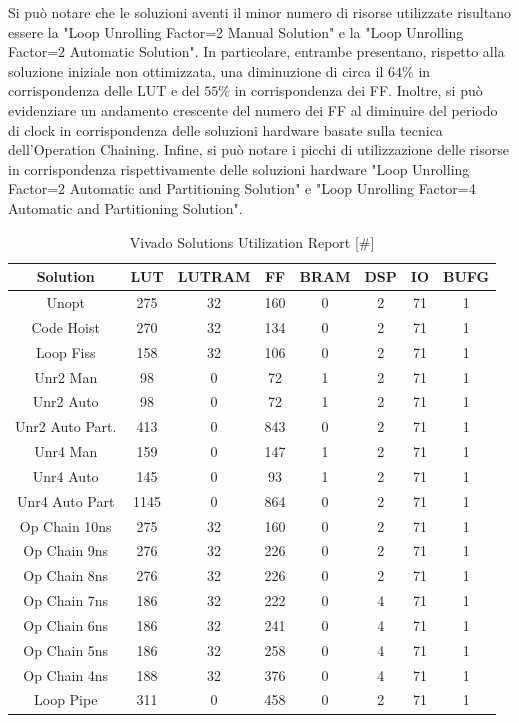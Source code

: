 Si può notare che le soluzioni aventi il minor numero di risorse utilizzate risultano essere la "Loop Unrolling Factor=2 Manual Solution" e la "Loop Unrolling Factor=2 Automatic Solution". In particolare, entrambe presentano, rispetto alla soluzione iniziale non ottimizzata, una diminuzione di circa il $64\%$ in corrispondenza delle LUT e del $55\%$ in corrispondenza dei FF. Inoltre, si può evidenziare un andamento crescente del numero dei FF al diminuire del periodo di clock in corrispondenza delle soluzioni hardware basate sulla tecnica dell'Operation Chaining. Infine, si può notare i picchi di utilizzazione delle risorse in corrispondenza rispettivamente delle soluzioni hardware "Loop Unrolling Factor=2 Automatic and Partitioning Solution" e "Loop Unrolling Factor=4 Automatic and Partitioning Solution".

\begin{table}[H]
	\centering
	\begin{tabular}{|c|c|c|c|c|c|c|c|}
		\hline
		\textbf{Solution} & \textbf{LUT} & \textbf{LUTRAM} & \textbf{FF} & \textbf{BRAM} & \textbf{DSP} & \textbf{IO} & \textbf{BUFG} \\
		\hline
		Unopt & 275 & 32 & 160 & 0 & 2 & 71 & 1 \\
		Code Hoist & 270 & 32 & 134 & 0 & 2 & 71 & 1 \\
		Loop Fiss & 158 & 32 & 106 & 0 & 2 & 71 & 1 \\
		Unr2 Man & 98 & 0 & 72 & 1 & 2 & 71 & 1 \\
		Unr2 Auto & 98 & 0 & 72 & 1 & 2 & 71 & 1 \\
		Unr2 Auto Part. & 413 & 0 & 843 & 0 & 2 & 71 & 1 \\
		Unr4 Man & 159 & 0 & 147 & 1 & 2 & 71 & 1 \\
		Unr4 Auto & 145 & 0 & 93 & 1 & 2 & 71 & 1 \\
		Unr4 Auto Part & 1145 & 0 & 864 & 0 & 2 & 71 & 1 \\
		Op Chain 10ns & 275 & 32 & 160 & 0 & 2 & 71 & 1 \\
		Op Chain 9ns & 276 & 32 & 226 & 0 & 2 & 71 & 1 \\
		Op Chain 8ns & 276 & 32 & 226 & 0 & 2 & 71 & 1 \\
		Op Chain 7ns & 186 & 32 & 222 & 0 & 4 & 71 & 1 \\
		Op Chain 6ns & 186 & 32 & 241 & 0 & 4 & 71 & 1 \\
		Op Chain 5ns & 186 & 32 & 258 & 0 & 4 & 71 & 1 \\
		Op Chain 4ns & 188 & 32 & 376 & 0 & 4 & 71 & 1 \\
		Loop Pipe & 311 & 0 & 458 & 0 & 2 & 71 & 1 \\
		\hline
	\end{tabular}
	\caption{Vivado Solutions Utilization Report [\#]}
	\label{tab:vivado-solutions-utilization-report}
\end{table}

